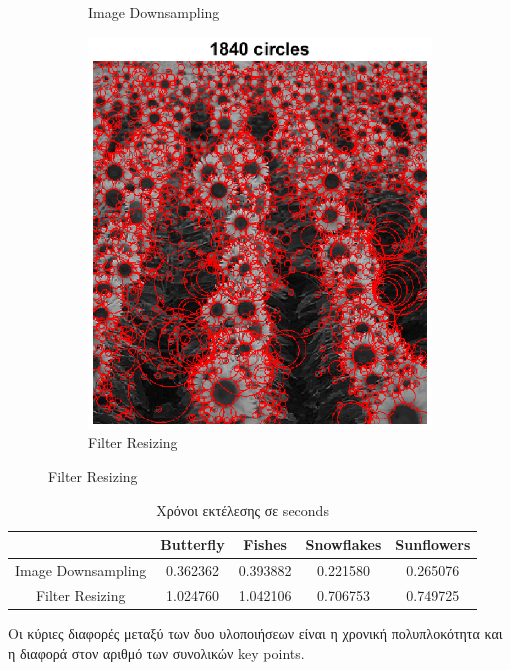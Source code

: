 \documentclass{article}
\newcommand{\tl}[1]{\textlatin{#1}}
\begin{document}
\begin{figure}[H]
\begin{subfigure}[b]{0.37\textwidth}
			\caption{\tl{Image Downsampling}}	
		\end{subfigure}%
		\begin{subfigure}[b]{0.37\textwidth}
			\includegraphics[width=\textwidth]{res/sunflowers_blob.eps}	
			\caption{\tl{Filter Resizing}}	
		\end{subfigure}%
	\end{figure}
	\begin{table}[!ht]  
		\centering
		\begin{tabular}{|c|c|c|c|c|}
			\cline{2-5}
			\multicolumn{1}{c|}{} & \tl{Butterfly} & \tl{Fishes} & \tl{Snowflakes}  & \tl{Sunflowers}\\ \hline
			\tl{Image Downsampling} & 0.362362  & 0.393882  & 0.221580 & 0.265076  \\ \hline
			\tl{Filter Resizing} & 1.024760 & 1.042106  & 0.706753 & 0.749725 \\ \hline
		\end{tabular}
		\caption{Χρόνοι εκτέλεσης σε \tl{seconds}}
	\end{table}
	\pagebreak	
	\noindent
	Οι κύριες διαφορές μεταξύ των δυο υλοποιήσεων είναι η χρονική πολυπλοκότητα και η διαφορά στον αριθμό των συνολικών \tl{key points.}\\\\
\end{document}
